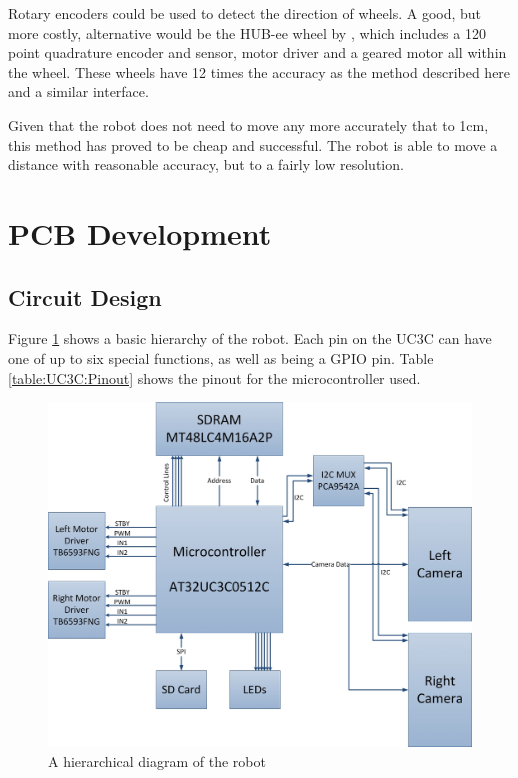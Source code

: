 Rotary encoders could be used to detect the direction of wheels. A good, but more costly, alternative would be the HUB-ee wheel by \cite{Creative_Robotics}, which includes a 120 point quadrature encoder and sensor, motor driver and a geared motor all within the wheel. These wheels have 12 times the accuracy as the method described here and a similar interface. 
 
Given that the robot does not need to move any more accurately that to 1cm, this method has proved to be cheap and successful. The robot is able to move a distance with reasonable accuracy, but to a fairly low resolution.

\section{PCB Development}\label{Section:PCB_Dev}
\subsection{Circuit Design}

Figure \ref{fig:Hierarchical} shows a basic hierarchy of the robot. Each pin on the UC3C can have one of up to six special functions, as well as being a GPIO pin.  Table \ref{table:UC3C:Pinout} shows the pinout for the microcontroller used. 
\begin{figure}
\includegraphics[width=\textwidth]{Figures/hierarchy.jpg}
\caption{A hierarchical diagram of the robot}
\label{fig:Hierarchical}
\end{figure}

